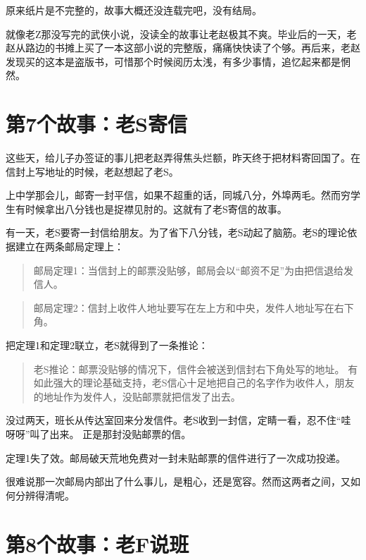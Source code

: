 \documentclass[openany]{ctexbook}
\begin{document}
原来纸片是不完整的，故事大概还没连载完吧，没有结局。

就像老Z那没写完的武侠小说，没读全的故事让老赵极其不爽。毕业后的一天，老赵从路边的书摊上买了一本这部小说的完整版，痛痛快快读了个够。再后来，老赵发现买的这本是盗版书，可惜那个时候阅历太浅，有多少事情，追忆起来都是惘然。

\chapter*{第7个故事：老S寄信}\label{s7}

这些天，给儿子办签证的事儿把老赵弄得焦头烂额，昨天终于把材料寄回国了。在信封上写地址的时候，老赵想起了老S。

上中学那会儿，邮寄一封平信，如果不超重的话，同城八分，外埠两毛。然而穷学生有时候拿出八分钱也是捉襟见肘的。这就有了老S寄信的故事。

有一天，老S要寄一封信给朋友。为了省下八分钱，老S动起了脑筋。老S的理论依据建立在两条邮局定理上：

\begin{quote}
邮局定理1：当信封上的邮票没贴够，邮局会以``邮资不足''为由把信退给发信人。
\end{quote}

\begin{quote}
邮局定理2：信封上收件人地址要写在左上方和中央，发件人地址写在右下角。
\end{quote}

把定理1和定理2联立，老S就得到了一条推论：

\begin{quote}
老S推论：邮票没贴够的情况下，信件会被送到信封右下角处写的地址。
有如此强大的理论基础支持，老S信心十足地把自己的名字作为收件人，朋友的地址作为发件人，没贴邮票就把信发了出去。
\end{quote}

没过两天，班长从传达室回来分发信件。老S收到一封信，定睛一看，忍不住``哇呀呀''叫了出来。
正是那封没贴邮票的信。

定理1失了效。邮局破天荒地免费对一封未贴邮票的信件进行了一次成功投递。

很难说那一次邮局内部出了什么事儿，是粗心，还是宽容。然而这两者之间，又如何分辨得清呢。

\chapter*{第8个故事：老F说班}\label{f8}
\end{document}
